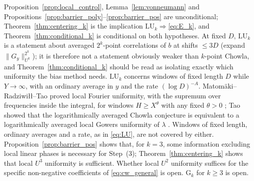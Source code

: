 \begin{remark}
\label{rem:status}
Proposition~\ref{prop:local_control}, Lemma~\ref{lem:vonneumann} and Propositions~\ref{prop:barrier_poly}--\ref{prop:barrier_pos} are unconditional; Theorem~\ref{thm:centering_k} is the implication $\mathrm{LU}_k\Rightarrow$\eqref{eq:E_k}, and Theorem~\ref{thm:conditional_k} is conditional on both hypotheses. At fixed $D$, $\mathrm{LU}_k$ is a statement about averaged $2^k$-point correlations of $b$ at shifts $\le3D$ (expand $\|G_y\|_{U^k}^{2^k}$); it is therefore not a statement obviously weaker than $k$-point Chowla, and Theorem~\ref{thm:conditional_k} should be read as isolating exactly which uniformity the bias method needs. $\mathrm{LU}_k$ concerns windows of fixed length $D$ while $Y\to\infty$, with an ordinary average in $y$ and the rate $(\log D)^{-A}$. Matomäki--Radziwi{\l}{\l}--Tao proved local Fourier uniformity, with the supremum over frequencies inside the integral, for windows $H\ge X^\theta$ with any fixed $\theta>0$ \cite[Theorem~1.2, p.~4]{MRT2020}; Tao showed that the logarithmically averaged Chowla conjecture is equivalent to a logarithmically averaged local Gowers uniformity of $\lambda$ \cite{Tao2017}. Windows of fixed length, ordinary averages and a rate, as in \eqref{eq:LU}, are not covered by either. Proposition~\ref{prop:barrier_pos} shows that, for $k=3$, some information excluding local linear phases is necessary for Step~(3); Theorem~\ref{thm:centering_k} shows that local $U^3$ uniformity is sufficient. Whether local $U^2$ uniformity suffices for the specific non-negative coefficients of \eqref{eq:cw_general} is open. $\mathrm{G}_k$ for $k\ge3$ is open.
\end{remark}
